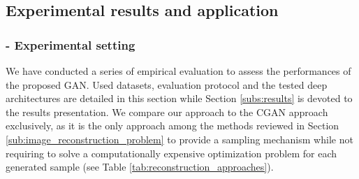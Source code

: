 \FloatBarrier

\subsection{Experimental results and application}
\label{sec:experiments}

\subsubsection{- Experimental setting} \label{sec:experiments_protocol}
We have conducted a series of empirical evaluation to assess the performances of the proposed GAN. Used datasets, evaluation protocol and the tested deep architectures are detailed in this section while Section \ref{subs:results} is devoted to the results presentation. We compare our approach to the \ac{CGAN} approach exclusively, as it is the only approach among the methods reviewed in Section \ref{sub:image_reconstruction_problem} to provide a sampling  mechanism while not requiring to solve a computationally expensive optimization problem for each generated sample (see Table \ref{tab:reconstruction_approaches}). \\


